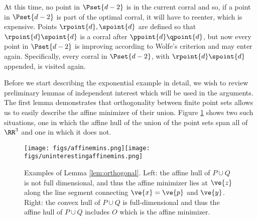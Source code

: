 At this time, no point in $\Pset{d-2}$ is in the current corral and so, if a point in $\Pset{d-2}$ is part of the optimal corral, 
it will have to reenter, which is expensive. Points $\rpoint{d}, \spoint{d}$ are defined so that $\rpoint{d} \spoint{d}$ is a corral after 
$\ppoint{d} \qpoint{d}$, but now every point in $\Pset{d-2}$ is improving according to Wolfe's criterion and may enter again.
Specifically, every corral in $\Pset{d-2}$, with $\rpoint{d} \spoint{d}$ appended, is visited again.

Before we start describing the exponential example in detail, we wish to review preliminary lemmas of independent interest which will be used in the arguments. The first lemma demonstrates that orthogonality between finite point sets allows us to easily describe the affine minimizer of their union.  Figure \ref{fig:affinemins} shows two such situations, one in which the affine hull of the union of the point sets span all of $\RR^3$ and one in which it does not.

\begin{figure}[ht]
\centering
\texttt{[image: figs/affinemins.png]}\texttt{[image: figs/uninterestingaffinemins.png]}
\caption{Examples of Lemma \ref{lem:orthogonal}.  Left: the affine hull of $P\cup Q$ is not full dimensional, and thus the affine minimizer lies at $\ve{z}$ along the line segment connecting $\ve{x}=\ve{p}$ and $\ve{y}$.  Right: the convex hull of $P\cup Q$ is full-dimensional and thus the affine hull of $P\cup Q$ includes $O$ which is the affine minimizer.}
\label{fig:affinemins}
\end{figure}


